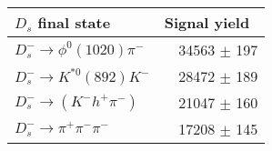  \begin{tabular}{l r }
\hline\hline
$D_s$ final state  & Signal yield\ \\
\hline
$D_{s}^{-} \to \phi^{0}(1020)\pi^{-}$ & 34563 $\pm$ 197 \\
$D_{s}^{-}\to K^{*0}(892)K^{-}$ & 28472 $\pm$ 189 \\
$D_{s}^{-}\to (K^{-}h^{+}\pi^{-})$ & 21047 $\pm$ 160 \\
$D_{s}^{-}\to \pi^{+}\pi^{-}\pi^{-}$ & 17208 $\pm$ 145 \\
\hline\hline
\end{tabular}
\label{table:normYieldsDs}
